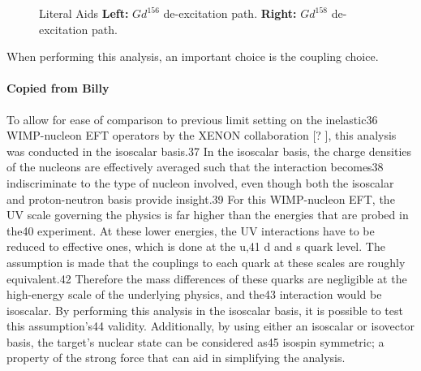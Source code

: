 \begin{figure}[!htbp]%
\centering
{}
\caption{Literal Aids
\textbf{Left:} $Gd^{156}$ de-excitation path.
\textbf{Right:} $Gd^{158}$ de-excitation path.
}
\label{fig:HENR_NotSpin_Recoil_Spectrum}
\end{figure}

\par
When performing this analysis, an important choice is the coupling choice.


\paragraph{Copied from Billy}
\par
To allow for ease of comparison to previous limit setting on the inelastic36
WIMP-nucleon EFT operators by the XENON collaboration [? ], this analysis was conducted in the isoscalar basis.37
In the isoscalar basis, the charge densities of the nucleons are effectively averaged such that the interaction becomes38
indiscriminate to the type of nucleon involved, even though both the isoscalar and proton-neutron basis provide insight.39
For this WIMP-nucleon EFT, the UV scale governing the physics is far higher than the energies that are probed in the40
experiment. At these lower energies, the UV interactions have to be reduced to effective ones, which is done at the u,41
d and s quark level. The assumption is made that the couplings to each quark at these scales are roughly equivalent.42
Therefore the mass differences of these quarks are negligible at the high-energy scale of the underlying physics, and the43
interaction would be isoscalar. By performing this analysis in the isoscalar basis, it is possible to test this assumption’s44
validity. Additionally, by using either an isoscalar or isovector basis, the target’s nuclear state can be considered as45
isospin symmetric; a property of the strong force that can aid in simplifying the analysis.

